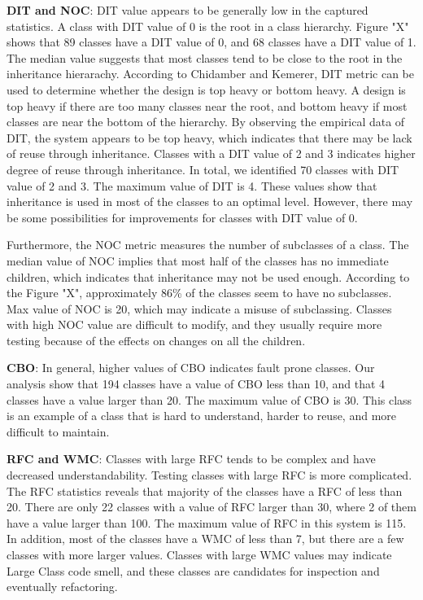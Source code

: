 \textbf{DIT and NOC}: DIT value appears to be generally low in the captured statistics. A class with DIT value of 0 is the root in a class hierarchy. Figure "X" shows that 89 classes have a DIT value of 0, and 68 classes have a DIT value of 1. The median value suggests that most classes tend to be close to the root in the inheritance hierarachy. According to Chidamber and Kemerer\cite{chidamber1994metrics}, DIT metric can be used to determine whether the design is top heavy or bottom heavy. A design is top heavy if there are too many classes near the root, and bottom heavy if most classes are near the bottom of the hierarchy. By observing the empirical data of DIT, the system appears to be top heavy, which indicates that there may be lack of reuse through inheritance. Classes with a DIT value of 2 and 3 indicates higher degree of reuse through inheritance. In total, we identified 70 classes with DIT value of 2 and 3. The maximum value of DIT is 4. These values show that inheritance is used in most of the classes to an optimal level. However, there may be some possibilities for improvements for classes with DIT value of 0. 

Furthermore, the NOC metric measures the number of subclasses of a class. The median value of NOC implies that most half of the classes has no immediate children, which indicates that inheritance may not be used enough. According to the Figure "X", approximately 86\% of the classes seem to have no subclasses. Max value of NOC is 20, which may indicate a misuse of subclassing. Classes with high NOC value are difficult to modify, and they usually require more testing because of the effects on changes on all the children. 


\textbf{CBO}: In general, higher values of CBO indicates fault prone classes. Our analysis show that 194 classes have a value of CBO less than 10, and that 4 classes have a value larger than 20. The maximum value of CBO is 30. This class is an example of a class that is hard to understand, harder to reuse, and more difficult to maintain. 

\textbf{RFC and WMC}: Classes with large RFC tends to be complex and have decreased understandability. Testing classes with large RFC is more complicated. The RFC statistics reveals that majority of the classes have a RFC of less than 20. There are only 22 classes with a value of RFC larger than 30, where 2 of them have a value larger than 100. The maximum value of RFC in this system is 115. In addition, most of the classes have a WMC of less than 7, but there are a few classes with more larger values. Classes with large WMC values may indicate Large Class code smell, and these classes are candidates for inspection and eventually refactoring. 


